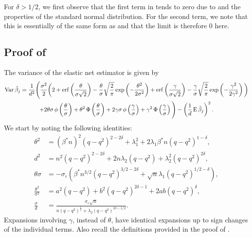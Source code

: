 For \(\delta > 1/2\), we first observe that the first term in
 tends to zero due to  and
the properties of the standard normal distribution. For the second term, we note that this
is essentially of the same form as  and that the limit is
therefore 0 here.

\subsection{Proof of }

The variance of the elastic net estimator is given by
\begin{multline}
  \label{eq:varthm-var}
  \operatorname{Var} \hat{\beta}_j = \frac{1}{d^2}\Bigg( \frac{\sigma^2}{2}\bigg(2 + \operatorname{erf}\left(\frac{\theta}{\sigma \sqrt{2}}\right) - \frac{\theta}{\sigma}\sqrt{\frac{2}{\pi}} \exp\left(-\frac{\theta^2}{2\sigma^2}\right) + \operatorname{erf}\left(\frac{\gamma}{\sigma\sqrt{2}}\right) - \frac{\gamma}{\sigma} \sqrt{\frac{2}{\pi}} \exp\left(- \frac{\gamma^2}{2\gamma^2}\right)\bigg) \\
  + 2\theta\sigma \operatorname{\phi}\left(\frac{\theta}{\sigma}\right) + \theta^2 \operatorname{\Phi}\left(\frac{\theta}{\sigma}\right) + 2\gamma \sigma \operatorname{\phi}\left(\frac{\gamma}{\sigma}\right) + \gamma^2 \operatorname{\Phi}\left(\frac{\gamma}{\sigma}\right) \Bigg)
  - \left(\frac{1}{d}\operatorname{E} \hat{\beta}_j\right)^2.
\end{multline}
We start by noting the following identities:
\[
  \begin{aligned}
    \theta^2                  & = \left(\beta^* n\right)^2 (q-q^2)^{2-2\delta} + \lambda_1^2 + 2\lambda_1 \beta^* n(q-q^2)^{1-\delta},                \\
    d^2                       & = n^2(q -q^2)^{2 - 2\delta} + 2n\lambda_2 (q-q^2) + \lambda_2^2 (q-q^2)^{2\delta},                                    \\
    \theta \sigma             & =  -\sigma_\varepsilon\left(\beta^* n^{3/2}(q- q^2)^{3/2-2\delta} + \sqrt{n} \lambda_1 (q-q^2)^{1/2 - \delta}\right), \\
    \frac{\theta^2}{\sigma^2} & = a^2(q-q^2) + b^2(q-q^2)^{2\delta - 1} + 2ab (q -q^2)^\delta,                                                        \\
    \frac{\sigma}{d}          & = \frac{\sigma_\varepsilon \sqrt{n}}{n(q-q^2)^\frac{1}{2} + \lambda_2 (q-q^2)^{2\delta - 1/2}}.
  \end{aligned}
\]
Expansions involving \(\gamma\), instead of \(\theta\), have identical expansions up to
sign changes of the individual terms. Also recall the definitions provided in the proof of
.

